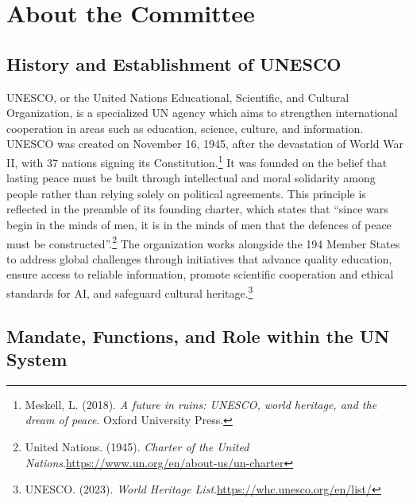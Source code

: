 \section{About the Committee}

\subsection{History and Establishment of UNESCO}

UNESCO, or the United Nations Educational, Scientific, and Cultural Organization, is a specialized UN agency which aims to strengthen international cooperation in areas such as education, science, culture, and information. UNESCO was created on November 16, 1945, after the devastation of World War II, with 37 nations signing its Constitution.\footnote{Meskell, L. (2018). \emph{A future in ruins: UNESCO, world heritage, and the dream of peace}. Oxford University Press.} It was founded on the belief that lasting peace must be built through intellectual and moral solidarity among people rather than relying solely on political agreements. This principle is reflected in the preamble of its founding charter, which states that “since wars begin in the minds of men, it is in the minds of men that the defences of peace must be constructed”.\footnote{United Nations. (1945). \emph{Charter of the United Nations}.\url{https://www.un.org/en/about-us/un-charter}} The organization works alongside the 194 Member States to address global challenges through initiatives that advance quality education, ensure access to reliable information, promote scientific cooperation and ethical standards for AI, and safeguard cultural heritage.\footnote{UNESCO. (2023). \emph{World Heritage List}.\url{https://whc.unesco.org/en/list/}}

\subsection{Mandate, Functions, and Role within the UN System}

